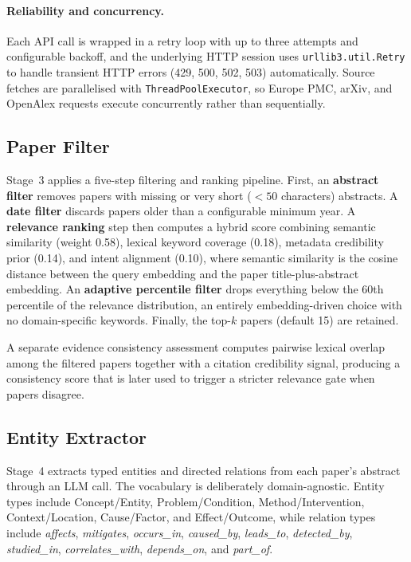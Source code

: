 \documentclass[11pt,a4paper]{article}
\begin{document}
\paragraph{Reliability and concurrency.}
Each API call is wrapped in a retry loop with up to three attempts and
configurable backoff, and the underlying HTTP session uses
\texttt{urllib3.util.Retry} to handle transient HTTP errors (429, 500, 502,
503) automatically. Source fetches are parallelised with
\texttt{ThreadPoolExecutor}, so Europe PMC, arXiv, and OpenAlex requests
execute concurrently rather than sequentially.

\subsection{Paper Filter}

Stage~3 applies a five-step filtering and ranking pipeline. First, an
\textbf{abstract filter} removes papers with missing or very short
($<50$ characters) abstracts. A \textbf{date filter} discards papers older
than a configurable minimum year. A \textbf{relevance ranking} step then
computes a hybrid score combining semantic similarity (weight 0.58), lexical
keyword coverage (0.18), metadata credibility prior (0.14), and intent
alignment (0.10), where semantic similarity is the cosine distance between
the query embedding and the paper title-plus-abstract embedding. An
\textbf{adaptive percentile filter} drops everything below the 60th
percentile of the relevance distribution, an entirely embedding-driven
choice with no domain-specific keywords. Finally, the top-$k$ papers
(default 15) are retained.

A separate evidence consistency assessment computes pairwise lexical
overlap among the filtered papers together with a citation credibility
signal, producing a consistency score that is later used to trigger a
stricter relevance gate when papers disagree.

\subsection{Entity Extractor}

Stage~4 extracts typed entities and directed relations from each paper's
abstract through an LLM call. The vocabulary is deliberately
domain-agnostic. Entity types include Concept/Entity, Problem/Condition,
Method/Intervention, Context/Location, Cause/Factor, and Effect/Outcome,
while relation types include \textit{affects}, \textit{mitigates},
\textit{occurs\_in}, \textit{caused\_by}, \textit{leads\_to},
\textit{detected\_by}, \textit{studied\_in}, \textit{correlates\_with},
\textit{depends\_on}, and \textit{part\_of}.
\end{document}
